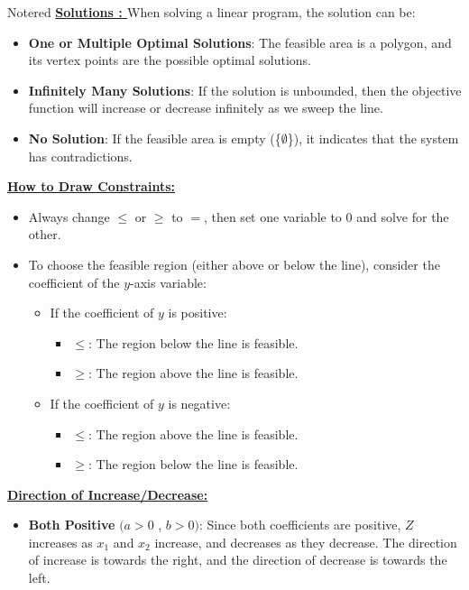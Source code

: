 \begin{prettyBox}{Note}{red}
 \textbf{\underline{Solutions : }}
When solving a linear program, the solution can be:
\begin{itemize}
    \item \textbf{One or Multiple Optimal Solutions}: The feasible area is a polygon, and its vertex points are the possible optimal solutions.
    \item \textbf{Infinitely Many Solutions}: If the solution is unbounded, then the objective function will increase or decrease infinitely as we sweep the line.
    \item \textbf{No Solution}: If the feasible area is empty (\{\(\emptyset\)\}), it indicates that the
system has contradictions.
\end{itemize}


\textbf{\underline{How to Draw Constraints:}}
\begin{itemize}
    \item Always change \(\leq\) or \(\geq\) to \(=\), then set one variable to \(0\) and solve for the other.
    \item To choose the feasible region (either above or below the line), consider the coefficient of the \(y\)-axis variable:
    \begin{itemize}
        \item If the coefficient of \(y\) is positive:
        \begin{itemize}
            \item \(\leq\): The region below the line is feasible.
            \item \(\geq\): The region above the line is feasible.
        \end{itemize}
        \item If the coefficient of \(y\) is negative:
        \begin{itemize}
            \item \(\leq\): The region above the line is feasible.
            \item \(\geq\): The region below the line is feasible.
        \end{itemize}
    \end{itemize}
\end{itemize}

\textbf{\underline{Direction of Increase/Decrease:}}

\begin{itemize}
    \item \textbf{Both Positive} \((a > 0\) , \(b > 0)\): Since both coefficients are positive, \( Z \) increases as
\( x_1 \) and \( x_2 \) increase, and decreases as they decrease. The direction of increase is towards the right,
and the direction of decrease is towards the left.


\end{itemize}
\end{prettyBox}
